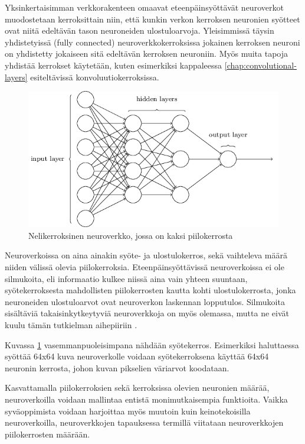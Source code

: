 \documentclass[finnish]{tktltiki2}
\theoremstyle{definition}
\theoremstyle{remark}
\begin{document}
  Yksinkertaisimman verkkorakenteen omaavat eteenpäinsyöttävät neuroverkot muodostetaan kerroksittain niin, että kunkin verkon kerroksen neuronien syötteet ovat niitä edeltävän tason neuroneiden ulostuloarvoja. 
  Yleisimmissä täysin yhdistetyissä (fully connected) neuroverkkokerroksissa jokainen kerroksen neuroni on yhdistetty jokaiseen sitä edeltävän kerroksen neuroniin. Myös muita tapoja yhdistää kerrokset käytetään, kuten esimerkiksi kappaleessa \ref{chap:convolutional-layers} esiteltävissä konvoluutiokerroksissa. 

  \begin{figure}[h]
    \centering
    \includegraphics[scale=0.5]{basic-neuralnet}
    \caption{Nelikerroksinen neuroverkko, jossa on kaksi piilokerrosta \cite{Nielsen-neural}}
    \label{pic:neuralnet}
  \end{figure}
  
  Neuroverkoissa on aina ainakin syöte- ja ulostulokerros, sekä vaihteleva määrä niiden välissä olevia piilokerroksia. Eteenpäinsyöttävissä neuroverkoissa ei ole silmukoita, eli informaatio kulkee niissä aina vain yhteen suuntaan, syötekerroksesta mahdollisten piilokerrosten kautta kohti ulostulokerrosta, jonka neuroneiden ulostuloarvot ovat neuroverkon laskennan lopputulos. Silmukoita sisältäviä takaisinkytkeytyviä neuroverkkoja on myös olemassa, mutta ne eivät kuulu tämän tutkielman aihepiiriin \cite{Long-short-memory-HochreiterS97}.

  Kuvassa \ref{pic:neuralnet} vasemmanpuoleisimpana nähdään syötekerros. Esimerkiksi haluttaessa syöttää 64x64 kuva neuroverkolle voidaan syötekerroksena käyttää 64x64 neuronin kerrosta, johon kuvan pikselien väriarvot koodataan.

  Kasvattamalla piilokerroksien sekä kerroksissa olevien neuronien määrää, neuroverkoilla voidaan mallintaa entistä monimutkaisempia funktioita. Vaikka syväoppimista voidaan harjoittaa myös muutoin kuin keinotekoisilla neuroverkoilla, neuroverkkojen tapauksessa termillä viitataan neuroverkkojen piilokerrosten määrään. 
\end{document}
